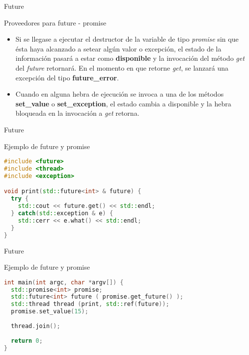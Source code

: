 \begin{frame}{Future}
\begin{block}{Proveedores para future - promise}
\begin{itemize}
  \item Si se llegase a ejecutar el destructor de la variable de tipo \textit{promise} sin que ésta haya alcanzado a setear algún valor o excepción, el estado de la información pasará a estar como \textbf{disponible} y la invocación del método \textit{get} del \textit{future} retornará. En el momento en que retorne \textit{get}, se lanzará una excepción del tipo \textbf{future\_error}.
  \item Cuando en alguna hebra de ejecución se invoca a una de los métodos \textbf{set\_value} o \textbf{set\_exception}, el estado cambia a disponible y la hebra bloqueada en la invocación a \textit{get} retorna.
\end{itemize}
\end{block}
\end{frame}

\begin{frame}[fragile]{Future}
\begin{block}{Ejemplo de future y promise}
\begin{lstlisting}[language=C++, basicstyle=\small]
#include <future>
#include <thread>
#include <exception>

void print(std::future<int> & future) {
  try {
    std::cout << future.get() << std::endl;
  } catch(std::exception & e) {
    std::cerr << e.what() << std::endl;
  }
}
\end{lstlisting}
\end{block}
\end{frame}

\begin{frame}[fragile]{Future}
\begin{block}{Ejemplo de future y promise}
\begin{lstlisting}[language=C++, basicstyle=\small]
int main(int argc, char *argv[]) {
  std::promise<int> promise;
  std::future<int> future ( promise.get_future() );
  std::thread thread (print, std::ref(future));
  promise.set_value(15);
  
  thread.join();
  
  return 0;
}
\end{lstlisting}
\end{block}
\end{frame}

